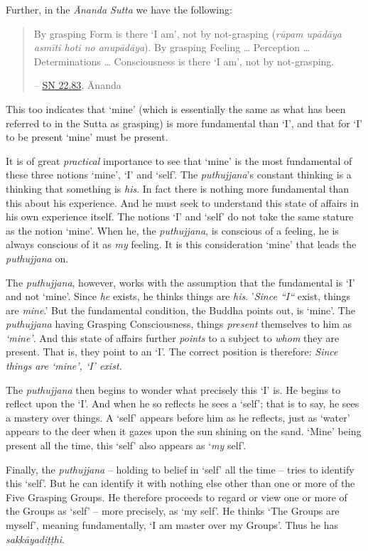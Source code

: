 Further, in the \textit{Ānanda Sutta} we have the following:

\begin{quote}
By grasping Form is there `I am', not by not-grasping (\textit{rūpam upādāya asmīti hoti no anupādāya}). By grasping Feeling \ldots{} Perception \ldots{} Determinations \ldots{} Consciousness is there `I am', not by not-grasping.

 -- \href{https://suttacentral.net/sn22.83/en/bodhi}{SN 22.83}, Ānanda
\end{quote}

This too indicates that `mine' (which is essentially the same as what has been referred to in the Sutta as grasping) is more fundamental than `I', and that for `I' to be present `mine' must be present.

It is of great \emph{practical} importance to see that `mine' is the most fundamental of these three notions `mine', `I' and `self'. The \textit{puthujjana}'s constant thinking is a thinking that something is \emph{his}. In fact there is nothing more fundamental than this about his experience. And he must seek to understand this state of affairs in his own experience itself. The notions `I' and `self' do not take the same stature as the notion `mine'. When he, the \textit{puthujjana}, is conscious of a feeling, he is always conscious of it as \emph{my} feeling. It is this consideration `mine' that leads the \textit{puthujjana} on.

The \textit{puthujjana}, however, works with the assumption that the fundamental is `I' and not `mine'. Since \emph{he} exists, he thinks things are \emph{his}. '\emph{Since ``I``} exist, things are \emph{mine}.' But the fundamental condition, the Buddha points out, is `mine'. The \textit{puthujjana} having Grasping Consciousness, things \emph{present} themselves to him as \emph{`mine'}. And this state of affairs further \emph{points} to a subject to \emph{whom} they are present. That is, they point to an `I'. The correct position is therefore: \emph{Since things are `mine', `I' exist.}

The \textit{puthujjana} then begins to wonder what precisely this `I' is. He begins to reflect upon the `I'. And when he so reflects he sees a `self'; that is to say, he sees a mastery over things. A `self' appears before him as he reflects, just as `water' appears to the deer when it gazes upon the sun shining on the sand. `Mine' being present all the time, this `self' also appears as `\emph{my} self'.

Finally, the \textit{puthujjana} -- holding to belief in `self' all the time -- tries to identify this `self'. But he can identify it with nothing else other than one or more of the Five Grasping Groups. He therefore proceeds to regard or view one or more of the Groups as `self' -- more precisely, as `my self'. He thinks `The Groups are myself', meaning fundamentally, `I am master over my Groups'. Thus he has \textit{sakkāyadiṭṭhi}.

